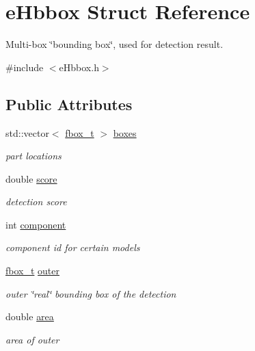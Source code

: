 \hypertarget{structeHbbox}{\section{e\-Hbbox Struct Reference}
\label{structeHbbox}
}


Multi-\/box \char`\"{}bounding box\char`\"{}, used for detection result.  




{\ttfamily \#include $<$e\-Hbbox.\-h$>$}

\subsection*{Public Attributes}
\begin{DoxyCompactItemize}
\item 
\hypertarget{structeHbbox_a2024e52994a0824e9392fd5f9743b947}{std\-::vector$<$ \hyperlink{eHbox_8h_a5a56d87a649d81945e96505ec76d6c54}{fbox\-\_\-t} $>$ \hyperlink{structeHbbox_a2024e52994a0824e9392fd5f9743b947}{boxes}}\label{structeHbbox_a2024e52994a0824e9392fd5f9743b947}

\begin{DoxyCompactList}\small\item\em part locations \end{DoxyCompactList}\item 
double \hyperlink{structeHbbox_a90d1b31a19d0facdeb4caaaba11af54d}{score}
\begin{DoxyCompactList}\small\item\em detection score \end{DoxyCompactList}\item 
int \hyperlink{structeHbbox_a7c6a5e808464ba2420a4b43461a5153e}{component}
\begin{DoxyCompactList}\small\item\em component id for certain models \end{DoxyCompactList}\item 
\hypertarget{structeHbbox_aecbaeae671315bf36d947c7fd22ed633}{\hyperlink{eHbox_8h_a5a56d87a649d81945e96505ec76d6c54}{fbox\-\_\-t} \hyperlink{structeHbbox_aecbaeae671315bf36d947c7fd22ed633}{outer}}\label{structeHbbox_aecbaeae671315bf36d947c7fd22ed633}

\begin{DoxyCompactList}\small\item\em outer \char`\"{}real\char`\"{} bounding box of the detection \end{DoxyCompactList}\item 
\hypertarget{structeHbbox_a8094fe8d4e59fb995b72f2fac8277cc7}{double \hyperlink{structeHbbox_a8094fe8d4e59fb995b72f2fac8277cc7}{area}}\label{structeHbbox_a8094fe8d4e59fb995b72f2fac8277cc7}

\begin{DoxyCompactList}\small\item\em area of outer \end{DoxyCompactList}\end{DoxyCompactItemize}



